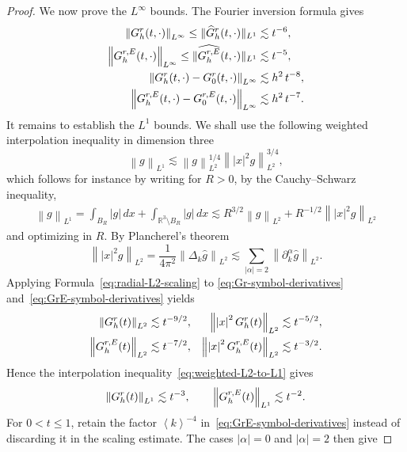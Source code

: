 \documentclass[10pt,a4paper]{amsart}
\newcommand		{\Gr}			{G^{\textnormal{r}}}
\newcommand		{\GrE}			{G^{\textnormal{r},E}}
\newcommand		{\Nrm}[2]		{\nrm{#1}_{#2}}
\newcommand		{\R}		{\RR}
\newcommand		{\RR}		{\mathbb R}			%
\newcommand		{\Rd}		{\R^3}
\newcommand		{\bangle}[1]	{\lt\langle #1\rt\rangle}
\newcommand	{\h}			{h}
\newcommand		{\hatG}			{\widehat{G}}
\newcommand		{\hatGr}		{\hatG^{\textnormal{r}}}
\newcommand		{\lt}			{\left}				%
\newcommand		{\n}[1]			{\lt\lvert{#1}\rt\rvert}	%
\newcommand		{\nrm}[1]		{\lt\lVert{#1}\rt\rVert}		%
\newcommand		{\rt}			{\right}			%
\newcommand		{\sNrm}[2]		{\snrm{#1}_{#2}}
\newcommand		{\snrm}[1]		{\lVert #1\rVert}
\newcommand		{\weight}[1]	{\bangle{#1}}	%
\begin{document}
\begin{proof}
		We now prove the $L^\infty$ bounds. The Fourier inversion formula gives 
		\begin{align*}
			\Nrm{\Gr_\h(t,\cdot)}{L^\infty} \leq\sNrm{\hatGr_\h(t,\cdot)}{L^1} &\lesssim t^{-6},
			\\
			\Nrm{\GrE_\h(t,\cdot)}{L^\infty} \leq\sNrm{\widehat{\GrE_\h}(t,\cdot)}{L^1} &\lesssim t^{-5},
			\\
			\Nrm{\Gr_\h(t,\cdot)-\Gr_0(t,\cdot)}{L^\infty} &\lesssim \h^2\, t^{-8},
			\\
			\Nrm{\GrE_\h(t,\cdot)-\GrE_0(t,\cdot)}{L^\infty} &\lesssim \h^2 \, t^{-7}.
		\end{align*}
		It remains to establish the $L^1$ bounds. We shall use the following weighted interpolation inequality in dimension three
		\begin{equation}\label{eq:weighted-L2-to-L1}
			\Nrm{g}{L^1} \lesssim \Nrm{g}{L^2}^{1/4} \Nrm{\n{x}^2g}{L^2}^{3/4} ,
		\end{equation}
		which follows for instance by writing for $R>0$, by the Cauchy--Schwarz inequality,
		\begin{align*}
			\Nrm{g}{L^1} = \int_{B_R} \n{g} \, dx + \int_{\Rd\setminus B_R} \n{g} \, dx 
			\lesssim R^{3/2}\Nrm{g}{L^2} + R^{-1/2}\Nrm{\n{x}^2g}{L^2}
		\end{align*}
		and optimizing in $R$. By Plancherel's theorem
		\begin{equation}\label{eq:weighted-plancherel}
			\Nrm{\n{x}^2g}{L^2}
			=\frac{1}{4\pi^2} \Nrm{\Delta_k\widehat g}{L^2}
			\lesssim
			\sum_{\n{\alpha}=2}
			\Nrm{\partial_k^\alpha\widehat g}{L^2}.
		\end{equation}
		Applying Formula~\eqref{eq:radial-L2-scaling} to \eqref{eq:Gr-symbol-derivatives} and~\eqref{eq:GrE-symbol-derivatives} yields
		\begin{align*}
			\Nrm{\Gr_\h(t)}{L^2} &\lesssim t^{-9/2},
			&\Nrm{\n{x}^2\Gr_\h(t)}{L^2}
			&\lesssim t^{-5/2},\\
			\Nrm{\GrE_\h(t)}{L^2}
			&\lesssim t^{-7/2},
			&\Nrm{\n{x}^2\GrE_\h(t)}{L^2}
			&\lesssim t^{-3/2}.
		\end{align*}
		Hence the interpolation inequality~\eqref{eq:weighted-L2-to-L1} gives
		\begin{equation*}
			\Nrm{\Gr_\h(t)}{L^1}\lesssim t^{-3},
			\qquad
			\Nrm{\GrE_\h(t)}{L^1}\lesssim t^{-2}.
		\end{equation*}
		For $0<t\leq1$, retain the factor $\weight{k}^{-4}$ in~\eqref{eq:GrE-symbol-derivatives} instead of discarding it in the scaling estimate. The cases $\n{\alpha}=0$ and $\n{\alpha}=2$ then give

\end{proof}
\end{document}
